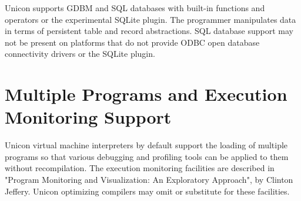 Unicon supports GDBM and SQL databases with
built-in functions and operators or the experimental SQLite plugin.
The programmer manipulates data in
terms of persistent table and record abstractions. SQL database support
may not be present on platforms that do not provide ODBC
open database connectivity drivers or the SQLite plugin.

\section{Multiple Programs and Execution Monitoring Support}

Unicon virtual machine interpreters by default support the loading of
multiple programs so that various debugging and profiling tools can be
applied to them without recompilation. The execution monitoring
facilities are described in "Program Monitoring and
Visualization: An Exploratory Approach", by Clinton
Jeffery. Unicon optimizing compilers may
omit or substitute for these facilities.
